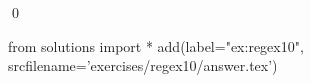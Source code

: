 
\begin{ex} 
  \label{ex:regex10}
  
  \qed
\end{ex} 
\begin{python0}
from solutions import *
add(label="ex:regex10",
    srcfilename='exercises/regex10/answer.tex') 
\end{python0}
